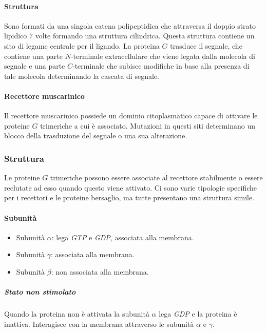 			\paragraph{Struttura}
			Sono formati da una singola catena polipeptidica che attraversa il doppio strato lipidico $7$ volte formando una struttura cilindrica.
			Questa struttura contiene un sito di legame centrale per il ligando.
			La proteina $G$ trasduce il segnale, che contiene una parte $N$-terminale extracellulare che viene legata dalla molecola di segnale e una parte $C$-terminale che subisce modifiche in base alla presenza di tale molecola determinando la cascata di segnale.

			\paragraph{Recettore muscarinico}
			Il recettore muscarinico possiede un dominio citoplasmatico capace di attivare le proteine $G$ trimeriche a cui \`e associato.
			Mutazioni in questi siti determinano un blocco della trasduzione del segnale o una sua alterazione.

		\subsubsection{Struttura}
		Le proteine $G$ trimeriche possono essere associate al recettore stabilmente o essere reclutate ad esso quando questo viene attivato.
		Ci sono varie tipologie specifiche per i recettori e le proteine bersaglio, ma tutte presentano una struttura simile.

			\paragraph{Subunit\`a}
			\begin{multicols}{2}
				\begin{itemize}
					\item Subunit\`a $\alpha$: lega \emph{GTP} e \emph{GDP}, associata alla membrana.
					\item Subunit\`a $\gamma$: associata alla membrana.
					\item Subunit\`a $\beta$: non associata alla membrana.
				\end{itemize}
			\end{multicols}

				\subparagraph{Stato non stimolato}
				Quando la proteina non \`e attivata la subunit\`a $\alpha$ lega \emph{GDP} e la proteina \`e inattiva.
				Interagisce con la membrana attraverso le subunit\`a $\alpha$ e $\gamma$.

